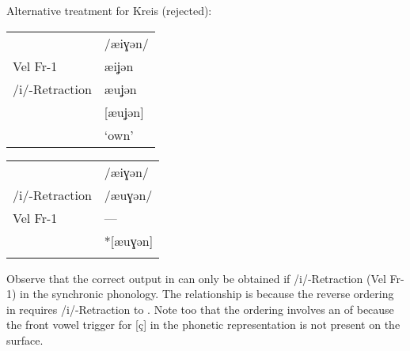 \ea%
\label{ex:7:23}Alternative treatment for Kreis  (rejected):\smallskip\\
\begin{multicols}{2}\raggedcolumns
\ea\label{ex:7:23a}
\begin{tabular}[t]{@{}ll@{}}
               & /æiɣən/ \\
Vel Fr-1       &  æiʝən  \\
/i/-Retraction &  æuʝən  \\
               &  [æuʝən]\\
               &  ‘own’  \\
\end{tabular}\columnbreak
\ex\label{ex:7:23b}
\begin{tabular}[t]{@{}ll@{}}
                 &  /æiɣən/\\
 /i/-Retraction  &  /æuɣən/\\
  Vel Fr-1       &  ---    \\
                 & *[æuɣən]\\
                 & \\
  \end{tabular}
\z
\end{multicols}
\z

Observe that the correct output in  can only be obtained if /i/-Retraction   (Vel Fr-1) in the synchronic phonology. The relationship is  because the reverse ordering in  requires /i/-Retraction to  . Note too that the  ordering involves an  of  because the front vowel trigger for [ç] in the phonetic representation is not present on the surface.

